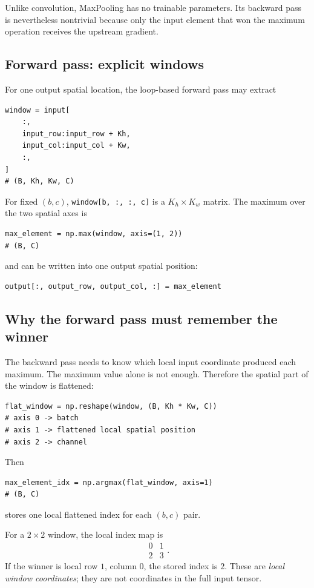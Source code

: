\documentclass[11pt,a4paper]{article}
\newcommand{\code}[1]{\texttt{#1}}
\begin{document}
Unlike convolution, MaxPooling has no trainable parameters. Its backward pass is nevertheless nontrivial because only the input element that won the maximum operation receives the upstream gradient.

\subsection{Forward pass: explicit windows}

For one output spatial location, the loop-based forward pass may extract
\begin{lstlisting}
window = input[
    :,
    input_row:input_row + Kh,
    input_col:input_col + Kw,
    :,
]
# (B, Kh, Kw, C)
\end{lstlisting}

For fixed $(b,c)$, \code{window[b, :, :, c]} is a $K_h\times K_w$ matrix. The maximum over the two spatial axes is
\begin{lstlisting}
max_element = np.max(window, axis=(1, 2))
# (B, C)
\end{lstlisting}
and can be written into one output spatial position:
\begin{lstlisting}
output[:, output_row, output_col, :] = max_element
\end{lstlisting}

\subsection{Why the forward pass must remember the winner}

The backward pass needs to know which local input coordinate produced each maximum. The maximum value alone is not enough. Therefore the spatial part of the window is flattened:
\begin{lstlisting}
flat_window = np.reshape(window, (B, Kh * Kw, C))
# axis 0 -> batch
# axis 1 -> flattened local spatial position
# axis 2 -> channel
\end{lstlisting}

Then
\begin{lstlisting}
max_element_idx = np.argmax(flat_window, axis=1)
# (B, C)
\end{lstlisting}
stores one local flattened index for each $(b,c)$ pair.

For a $2\times2$ window, the local index map is
\[
\begin{matrix}
0 & 1\\
2 & 3
\end{matrix}.
\]
If the winner is local row $1$, column $0$, the stored index is $2$. These are \emph{local window coordinates}; they are not coordinates in the full input tensor.
\end{document}
